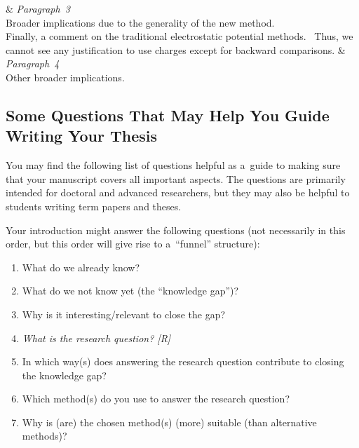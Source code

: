 \documentclass[11pt, a4paper, oneside]{article}
\newlength{\smalllinespacing}
\renewcommand{\caps}[1]{{\textscale{0.97}{\textls[50]{\MakeUppercase{#1}}}}}
\theoremstyle{Plain}
\theoremstyle{Definition}
\theoremstyle{Remark}
\begin{document}
\begin{longtblr}{}
	&
	{%
		\textit{Paragraph~3} \\
		Broader implications due to the generality of the new method.
	}
	\\
	\hspace{\smalllinespacing}Finally, a comment on the traditional electrostatic potential methods. \textellipsis\ Thus, we cannot see any justification to use \caps{CHELP} charges except for backward comparisons.
	&
	{%
		\textit{Paragraph~4} \\
		Other broader implications.
	}
\end{longtblr}

\endgroup

\subsection{Some Questions That May Help You Guide Writing Your Thesis}

You may find the following list of questions helpful as a~guide to making sure that your manu\-script covers all important aspects. The questions are primarily intended for doctoral and advanced researchers, but they may also be helpful to students writing term papers and theses.

Your introduction might answer the following questions (not necessarily in this order, but this order will give rise to a~``funnel'' structure):
\begin{enumerate}[widest* = 10]
	\item What do we already know?
	\item What do we not know yet (the ``knowledge gap'')?
	\item Why is it interesting\slash relevant to close the gap?
	\item \emph{What is the research question? [R]}
	\item In which way(s) does answering the research question contribute to closing the knowledge gap?
	\item Which method(s) do you use to answer the research question?
	\item Why is (are) the chosen method(s) (more) suitable (than alternative methods)?
\end{enumerate}
\end{document}
